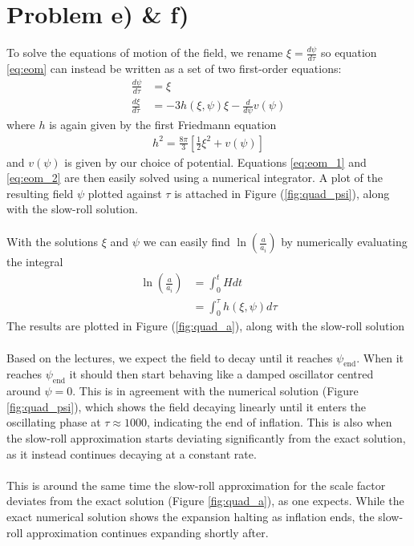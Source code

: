 \documentclass[reprint,english,notitlepage]{revtex4-1}  %
\numberwithin{equation}{section}
\begin{document}
\section{Problem e) \& f)}
To solve the equations of motion of the field, we rename
$\xi = \frac{d\psi}{d\tau}$ so equation \ref{eq:eom} can instead be written as
a set of two first-order equations:
\begin{align}
	\frac{d\psi}{d\tau} &= \xi \label{eq:eom_1} \\
	\frac{d\xi}{d\tau}  &= -3h(\xi, \psi) \xi - \frac{d}{d\psi}v(\psi) \label{eq:eom_2}
\end{align}
where $h$ is again given by the first Friedmann equation
\begin{align}
	h^2 = \frac{8\pi}{3}\left[ \frac{1}{2}\xi^2 + v(\psi)\right]
\end{align}
and $v(\psi)$ is given by our choice of potential. Equations \ref{eq:eom_1} and
\ref{eq:eom_2} are then easily solved using a numerical integrator. A plot of
the resulting field $\psi$ plotted against $\tau$ is attached in Figure
(\ref{fig:quad_psi}), along with the slow-roll solution.
\\ \\
With the
solutions $\xi$ and $\psi$ we can easily find $\ln\left(\frac{a}{a_i}\right)$
by numerically evaluating the integral
\begin{align}
	\ln\left(\frac{a}{a_i}\right) &= \int_0^t H dt \\
																&= \int_0^\tau h(\xi, \psi) d\tau
\end{align}
The results are plotted in Figure (\ref{fig:quad_a}), along with the slow-roll
solution
\\ \\
Based on the lectures, we expect the field to decay until it reaches $\psi_{\mathrm{end}}$.
When it reaches $\psi_{\mathrm{end}}$ it should then start behaving like a damped oscillator
centred around $\psi=0$. This is in agreement with the numerical solution
(Figure \ref{fig:quad_psi}), which shows the field decaying linearly until it
enters the oscillating phase at $\tau\approx 1000$, indicating the end of inflation.
This is also when the slow-roll approximation starts deviating significantly
from the exact solution, as it instead continues decaying at a constant rate.
\\ \\
This is around the same time the slow-roll approximation for the scale factor
deviates from the exact solution (Figure \ref{fig:quad_a}), as one expects.
While the exact numerical solution shows the expansion halting as inflation ends,
the slow-roll approximation continues expanding shortly after.
\end{document}
